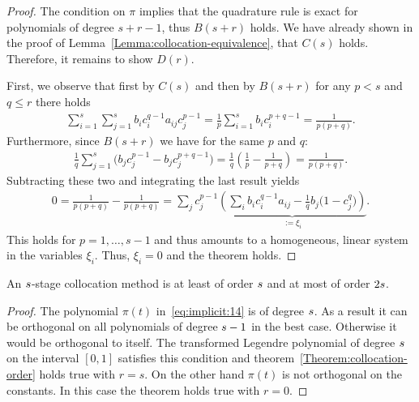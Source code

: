 \begin{proof}
  The condition on $\pi$ implies that the quadrature rule is exact for
  polynomials of degree $s+r-1$, thus $B(s+r)$ holds.
  We have already shown in the proof of
  Lemma~\ref{Lemma:collocation-equivalence}, that $C(s)$
  holds. Therefore, it remains to show $D(r)$.

  First, we observe that first by $C(s)$ and then by $B(s+r)$ for
  any $p<s$ and $q\le r$ there holds
  \begin{gather*}
    \sum_{i=1}^s\sum_{j=1}^s b_i c_i^{q-1} a_{ij} c_j^{p-1}
    = \frac1p \sum_{i=1}^s b_i c_i^{p+q-1}
    = \frac1{p(p+q)}.
  \end{gather*}
  Furthermore, since $B(s+r)$ we have for the same $p$ and $q$:
  \begin{gather*}
    \frac1q\sum_{j=1}^s\bigl(b_j c_j^{p-1} - b_j c_j^{p+q-1}\bigr)
    = \frac1q\left(\frac1p - \frac1{p+q}\right)
    = \frac1{p(p+q)}.
  \end{gather*}
  Subtracting these two and integrating the last result yields
  \begin{gather*}
    0 = \frac{1}{p(p+q)}-\frac{1}{p(p+q)} =
    \sum_{j} c_j^{p-1} \underbrace{\left(
      \sum_i b_i c_i^{q-1}a_{ij} - \frac1q b_j \bigl(1-c_j^q\bigr)
    \right)}_{:= \xi_i}.
  \end{gather*}
  This holds for $p=1,\dots,s-1$ and thus amounts to a homogeneous,
  linear system in the variables $\xi_i$. Thus, $\xi_i=0$ and the
  theorem holds.  
\end{proof}

\begin{corollary}
  An $s$-stage collocation method is at least of order
  $s$ and at most of order $2s$.
\end{corollary}

\begin{proof}
  The polynomial $\pi(t)$ in~\eqref{eq:implicit:14} is of degree
  $s$. As a result it can be orthogonal on all polynomials of
  degree $s-1$ in the best case.  Otherwise it would be orthogonal
  to itself.  The transformed Legendre polynomial of degree $s$ on
  the interval $[0,1]$ satisfies this condition and
  theorem~\ref{Theorem:collocation-order} holds true with
  $r=s$. On the other hand $\pi(t)$ is not orthogonal on the
  constants. In this case the theorem holds true with $r=0$.
\end{proof}




